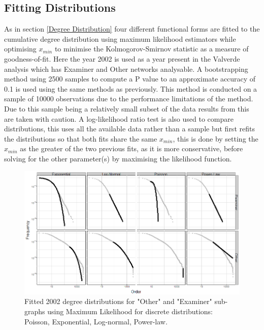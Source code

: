 
\subsection{Fitting Distributions} \label{section: Fitting Distributions}

As in section \ref{Degree Distribution} four different functional forms are fitted to the cumulative degree distribution using maximum likelihood estimators while optimising $x_{min}$ to minimise the Kolmogorov-Smirnov statistic as a measure of goodness-of-fit. Here the year 2002 is used as a year present in the Valverde analysis which has Examiner and Other networks analysable. A bootstrapping method using 2500 samples to compute a P value to an approximate accuracy of 0.1 is used using the same methods as previously. This method is conducted on a sample of 10000 observations due to the performance limitations of the method. Due to this sample being a relatively small subset of the data results from this are taken with caution. A log-likelihood ratio test is also used to compare distributions, this uses all the available data rather than a sample but first refits the distributions so that both fits share the same $x_{min}$, this is done by setting the $x_{min}$ as the greater of the two previous fits, as it is more conservative, before solving for the other parameter(s) by maximising the likelihood function. 

\begin{figure}
\centering
  \includegraphics[width=0.7\linewidth]{Figures/ExaminerOtherDistributionFit}
  \caption[Fitting Degree Distribution for "Examiner" and "Other" sub-graphs]{Fitted 2002 degree distributions for "Other" and "Examiner" sub-graphs using Maximum Likelihood for discrete distributions: Poisson, Exponential, Log-normal, Power-law.}
\label{fig:ExaminerOtherDistributionFit}
\end{figure}

